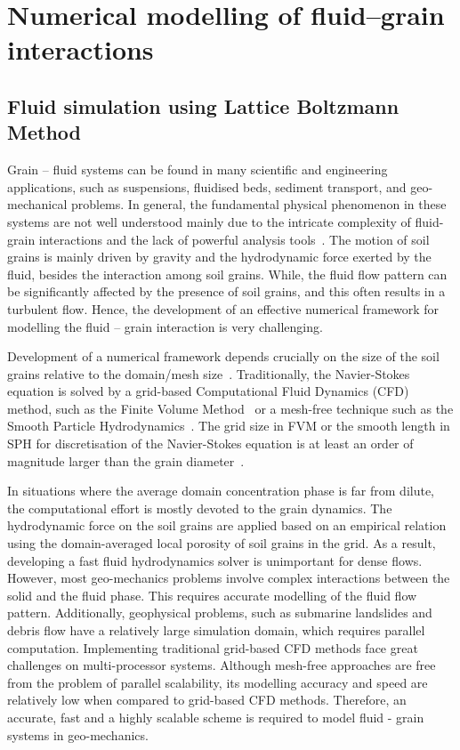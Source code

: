 \chapter{Numerical modelling of fluid–grain interactions}

\ifpdf
    \graphicspath{{Chapter5/figs/raster/}{Chapter5/figs/pdf/}{Chapter5/figs/}}
\else
    \graphicspath{{Chapter5/figs/vector/}{Chapter5/figs/}}
\fi


\section{Fluid simulation using Lattice Boltzmann Method}

Grain -- fluid systems can be found in many scientific and 
engineering applications, such as suspensions, fluidised beds, 
sediment transport, and geo-mechanical problems. In general, 
the fundamental physical phenomenon in these systems are not 
well understood mainly due to the intricate complexity of 
fluid-grain interactions and the lack of powerful analysis 
tools~\citep{Han2007b}. The motion of soil grains is mainly 
driven by gravity and the hydrodynamic force exerted by the 
fluid, besides the interaction among soil grains. While, the 
fluid flow pattern can be significantly affected by the 
presence of soil grains, and this often results in a turbulent 
flow. Hence, the development of an effective numerical 
framework for modelling the fluid -- grain interaction is very challenging.

Development of a numerical framework depends crucially on the 
size of the soil grains relative to the domain/mesh 
size~\citep{Feng2007}. Traditionally, the Navier-Stokes 
equation is solved by a grid-based Computational Fluid Dynamics 
(CFD) method, such as the Finite Volume 
Method~\citep{Capecelatro2013} or a mesh-free technique such as 
the Smooth Particle Hydrodynamics~\citep{Sun2013}. The grid 
size in FVM or the smooth length in SPH for discretisation of 
the Navier-Stokes equation is at least an order of magnitude 
larger than the grain diameter~\citep{Xiong2014}. 

In situations where the average domain concentration phase is 
far from dilute, the computational effort is mostly devoted to 
the grain dynamics. The hydrodynamic force on the soil grains 
are applied based on an empirical relation using the 
domain-averaged local porosity of soil grains in the grid. 
As a result, developing a fast fluid hydrodynamics solver is 
unimportant for dense flows. However, most geo-mechanics 
problems involve complex interactions between the solid and the 
fluid phase. This requires accurate modelling of the 
fluid flow pattern. Additionally, geophysical problems, such as 
submarine landslides and debris flow have a relatively large 
simulation domain, which requires parallel computation. 
Implementing traditional grid-based CFD methods 
face great challenges on multi-processor systems. Although 
mesh-free approaches are free from the problem of parallel 
scalability, its modelling accuracy and speed are relatively 
low when compared to grid-based CFD methods. Therefore, an 
accurate, fast and a highly scalable scheme is required 
to model fluid - grain systems in geo-mechanics. 
 
